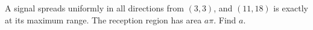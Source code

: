 A signal spreads uniformly in all directions from $(3,3)$, and $(11,18)$ is exactly at its maximum range. The reception region has area $a\pi$. Find $a$.

